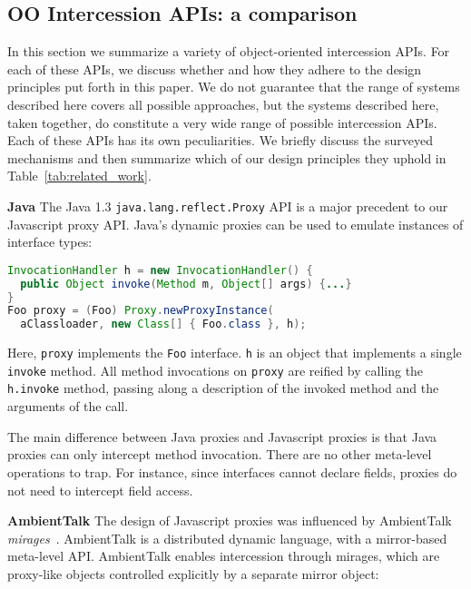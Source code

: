 \documentclass{acm_proc_article-sp}
\begin{document}
\subsection{OO Intercession APIs: a comparison}
\label{sub:survey}

In this section we summarize a variety of object-oriented intercession APIs. For each of these APIs, we discuss whether and how they adhere to the design principles put forth in this paper. We do not guarantee that the range of systems described here covers all possible approaches, but the systems described here, taken together, do constitute a very wide range of possible intercession APIs. Each of these APIs has its own peculiarities. We briefly discuss the surveyed mechanisms and then summarize which of our design principles they uphold in Table~\ref{tab:related_work}.

\textbf{Java} The Java 1.3 \texttt{java.lang.reflect.Proxy} API is a major precedent to our Javascript proxy API. Java's dynamic proxies can be used to emulate instances of interface types:

\begin{lstlisting}[language=java]
InvocationHandler h = new InvocationHandler() {
  public Object invoke(Method m, Object[] args) {...}
}
Foo proxy = (Foo) Proxy.newProxyInstance(
  aClassloader, new Class[] { Foo.class }, h);
\end{lstlisting}

Here, \texttt{proxy} implements the \texttt{Foo} interface. \texttt{h} is an object that implements a single \texttt{invoke} method. All method invocations on \texttt{proxy} are reified by calling the \texttt{h.invoke} method, passing along a description of the invoked method and the arguments of the call.

The main difference between Java proxies and Javascript proxies is that Java proxies can only intercept method invocation. There are no other meta-level operations to trap. For instance, since interfaces cannot declare fields, proxies do not need to intercept field access.

\textbf{AmbientTalk} The design of Javascript proxies was influenced by AmbientTalk \emph{mirages}~\cite{mirages_dls_07,spe_journal_08}. AmbientTalk is a distributed dynamic language, with a mirror-based meta-level API. AmbientTalk enables intercession through mirages, which are proxy-like objects controlled explicitly by a separate mirror object:
\end{document}
